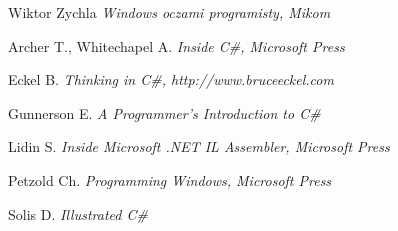 ﻿\begin{thebibliography}{99999}

Wiktor Zychla {\em Windows oczami programisty, Mikom}

Archer T., Whitechapel A. {\em Inside C\#, Microsoft Press}

Eckel B. {\em Thinking in C\#, http://www.bruceeckel.com}

Gunnerson E. {\em A Programmer's Introduction to C\#}

Lidin S. {\em Inside Microsoft .NET IL Assembler, Microsoft Press}

Petzold Ch. {\em Programming Windows, Microsoft Press}

Solis D. {\em Illustrated C\#}

\end{thebibliography}
